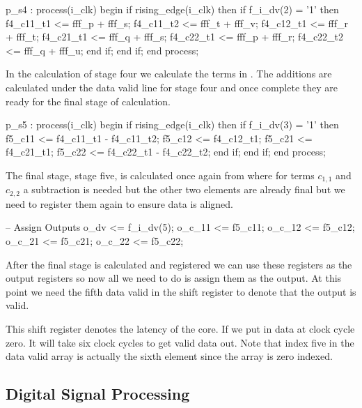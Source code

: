 \begin{VHDLlisting}[tabsize]
p_s4 : process(i_clk)
begin
    if rising_edge(i_clk) then
        if f_i_dv(2) = '1' then
            f4_c11_t1 <= fff_p + fff_s;
            f4_c11_t2 <= fff_t + fff_v;
            f4_c12_t1 <= fff_r + fff_t;
            f4_c21_t1 <= fff_q + fff_s;
            f4_c22_t1 <= fff_p + fff_r;
            f4_c22_t2 <= fff_q + fff_u;
        end if;
    end if;
end process;
\end{VHDLlisting}

In the calculation of stage four we calculate the terms in . The additions are calculated under the data valid line for stage four and once complete they are ready for the final stage of calculation. 

\begin{VHDLlisting}[tabsize=2]
p_s5 : process(i_clk)
begin
    if rising_edge(i_clk) then
        if f_i_dv(3) = '1' then
            f5_c11 <= f4_c11_t1 - f4_c11_t2;
            f5_c12 <= f4_c12_t1;
            f5_c21 <= f4_c21_t1;
            f5_c22 <= f4_c22_t1 - f4_c22_t2;
        end if;
    end if;
end process;
\end{VHDLlisting} 

The final stage, stage five, is calculated once again from  where for terms $c_{1,1}$ and $c_{2,2}$ a subtraction is needed but the other two elements are already final but we need to register them again to ensure data is aligned. 

\begin{VHDLlisting}[tabsize=2]
-- Assign Outputs
o_dv   <= f_i_dv(5);
o_c_11 <= f5_c11;
o_c_12 <= f5_c12;
o_c_21 <= f5_c21;
o_c_22 <= f5_c22;
\end{VHDLlisting}

After the final stage is calculated and registered we can use these registers as the output registers so now all we need to do is assign them as the output. At this point we need the fifth data valid in the shift register to denote that the output is valid. 

This shift register denotes the latency of the core. If we put in data at clock cycle zero. It will take six clock cycles to get valid data out. Note that index five in the data valid array is actually the sixth element since the array is zero indexed. 

\subsection{Digital Signal Processing}
	
